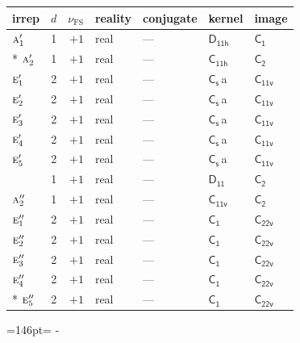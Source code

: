 \documentclass[10pt,a4paper]{article}
\newcommand{\needspace}[1]{\par\penalty-100\begingroup\dimen0=#1\relax\dimen2=\pagegoal
  \advance\dimen2-\pagetotal\ifdim\dimen0>\dimen2\relax\ifdim\dimen2>0pt\vfil\break\fi\fi
  \endgroup}
\numberwithin{equation}{section}
\newcommand{\grp}[1]{\mathsf{#1}}
\newcommand{\irr}[1]{\text{\normalfont\scshape #1}}
\newcommand{\detbox}[1]{{\setlength{\fboxsep}{1pt}\fbox{#1}}}
\newcommand{\clsletter}[1]{\,{\scriptsize\color{black!55}#1}}
\newcommand{\fsind}{\nu_{\mathrm{FS}}}
\begin{document}
{\small\renewcommand{\arraystretch}{1.25}\begin{longtable}{@{}lrrllll@{}}\toprule
irrep & $d$ & $\fsind$ & reality & conjugate & kernel & image\\\midrule\endhead
\bottomrule\endfoot\endlastfoot
$\irr{a}_{1}'$ & 1 & $+1$ & real & --- & \href{D11h.pdf}{$\grp{D_{11h}}$} & \href{C1.pdf}{$\grp{C_{1}}$}\\*
$\irr{a}_{2}'$ & 1 & $+1$ & real & --- & \href{C11h.pdf}{$\grp{C_{11h}}$} & \href{C2.pdf}{$\grp{C_{2}}$}\\
$\irr{e}_{1}'$ & 2 & $+1$ & real & --- & \href{C1v.pdf}{$\grp{C_{s}}$}\clsletter{a} & \href{C11v.pdf}{$\grp{C_{11v}}$}\\
$\irr{e}_{2}'$ & 2 & $+1$ & real & --- & \href{C1v.pdf}{$\grp{C_{s}}$}\clsletter{a} & \href{C11v.pdf}{$\grp{C_{11v}}$}\\
$\irr{e}_{3}'$ & 2 & $+1$ & real & --- & \href{C1v.pdf}{$\grp{C_{s}}$}\clsletter{a} & \href{C11v.pdf}{$\grp{C_{11v}}$}\\
$\irr{e}_{4}'$ & 2 & $+1$ & real & --- & \href{C1v.pdf}{$\grp{C_{s}}$}\clsletter{a} & \href{C11v.pdf}{$\grp{C_{11v}}$}\\
$\irr{e}_{5}'$ & 2 & $+1$ & real & --- & \href{C1v.pdf}{$\grp{C_{s}}$}\clsletter{a} & \href{C11v.pdf}{$\grp{C_{11v}}$}\\
\detbox{$\irr{a}_{1}''$} & 1 & $+1$ & real & --- & \href{D11.pdf}{$\grp{D_{11}}$} & \href{C2.pdf}{$\grp{C_{2}}$}\\
$\irr{a}_{2}''$ & 1 & $+1$ & real & --- & \href{C11v.pdf}{$\grp{C_{11v}}$} & \href{C2.pdf}{$\grp{C_{2}}$}\\
$\irr{e}_{1}''$ & 2 & $+1$ & real & --- & \href{C1.pdf}{$\grp{C_{1}}$} & $\grp{C_{22v}}$\\
$\irr{e}_{2}''$ & 2 & $+1$ & real & --- & \href{C1.pdf}{$\grp{C_{1}}$} & $\grp{C_{22v}}$\\
$\irr{e}_{3}''$ & 2 & $+1$ & real & --- & \href{C1.pdf}{$\grp{C_{1}}$} & $\grp{C_{22v}}$\\
$\irr{e}_{4}''$ & 2 & $+1$ & real & --- & \href{C1.pdf}{$\grp{C_{1}}$} & $\grp{C_{22v}}$\\*
$\irr{e}_{5}''$ & 2 & $+1$ & real & --- & \href{C1.pdf}{$\grp{C_{1}}$} & $\grp{C_{22v}}$\\
\bottomrule\end{longtable}}
\needspace{146pt}
\end{document}
